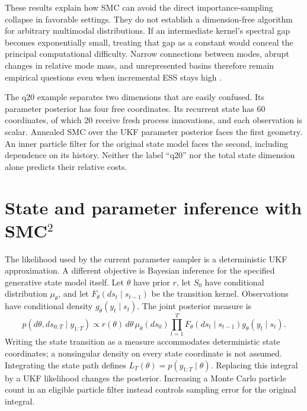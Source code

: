 These results explain how SMC can avoid the direct importance-sampling
collapse in favorable settings. They do not establish a dimension-free
algorithm for arbitrary multimodal distributions. If an intermediate
kernel's spectral gap becomes exponentially small, treating that gap as a
constant would conceal the principal computational difficulty. Narrow
connections between modes, abrupt changes in relative mode mass, and
unrepresented basins therefore remain empirical questions even when
incremental ESS stays high \citep[Sections 3.1--3.3]{dai2022smc}.

The q20 example separates two dimensions that are easily confused. Its
parameter posterior has four free coordinates. Its recurrent state has
60 coordinates, of which 20 receive fresh process innovations, and each
observation is scalar. Annealed SMC over the UKF parameter posterior faces
the first geometry. An inner particle filter for the original state model
faces the second, including dependence on its history. Neither the label
``q20'' nor the total state dimension alone predicts their relative costs.

\section{State and parameter inference with SMC\texorpdfstring{$^2$}{2}}
\label{sec:bf-is-smc2}

The likelihood used by the current parameter sampler is a deterministic
UKF approximation. A different objective is Bayesian inference for the
specified generative state model itself. Let $\theta$ have prior $r$,
let $S_0$ have conditional distribution $\mu_\theta$, and let
$F_\theta(ds_t\mid s_{t-1})$ be the transition kernel. Observations have
conditional density $g_\theta(y_t\mid s_t)$. The joint posterior measure is
\begin{equation}
 p(d\theta,ds_{0:T}\mid y_{1:T})\propto
 r(\theta)\,d\theta\,\mu_\theta(ds_0)
 \prod_{t=1}^T F_\theta(ds_t\mid s_{t-1})
                         g_\theta(y_t\mid s_t).
 \label{eq:bf-is-smc2-joint}
\end{equation}
Writing the state transition as a measure accommodates deterministic state
coordinates; a nonsingular density on every state coordinate is not assumed.
Integrating the state path defines $L_T(\theta)=p(y_{1:T}\mid\theta)$.
Replacing this integral by a UKF likelihood changes the posterior.
Increasing a Monte Carlo particle count in an eligible particle filter
instead controls sampling error for the original integral.

